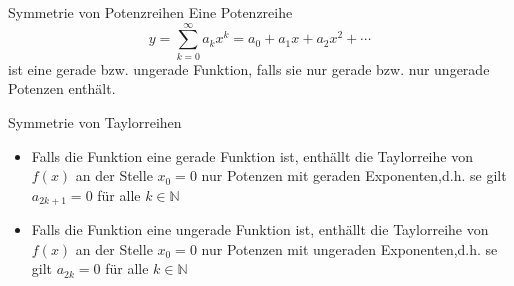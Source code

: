 \begin{concept}{Symmetrie von Potenzreihen}
  Eine Potenzreihe
  \[y=\sum_{k=0}^{\infty}{a_kx^k}=a_0+a_1x+a_2x^2+\cdots\]
  ist eine gerade bzw. ungerade Funktion, falls sie nur gerade bzw. nur ungerade Potenzen enthält.
\end{concept}

\begin{concept}{Symmetrie von Taylorreihen}
  \begin{itemize}
    \item  Falls die Funktion eine gerade Funktion ist, enthällt die Taylorreihe von \(f(x)\) an der Stelle \(x_0 = 0\)
      nur Potenzen mit geraden Exponenten,d.h. se gilt \(a_{2k+1}=0\) für alle \(k\in\mathbb{N}\)
    \item  Falls die Funktion eine ungerade Funktion ist, enthällt die Taylorreihe von \(f(x)\) an der Stelle \(x_0 = 0\)
      nur Potenzen mit ungeraden Exponenten,d.h. se gilt \(a_{2k}=0\) für alle \(k\in\mathbb{N}\)
  \end{itemize}
\end{concept}


